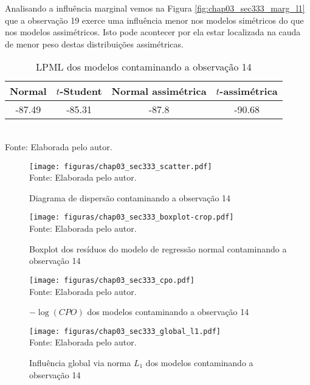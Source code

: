 Analisando a influência marginal vemos na Figura \ref{fig:chap03_sec333_marg_l1} que a observação 19 exerce uma influência menor nos modelos simétricos do que nos modelos assimétricos. Isto pode acontecer por ela estar localizada na cauda de menor peso destas distribuições assimétricas.

\begin{table}[H]
\begin{center}
\caption{LPML dos modelos contaminando a observação 14}
\label{tab:chap03_sec333_lpml}
\begin{tabular}{cccc}
 Normal & $t$-Student & Normal assimétrica  & $t$-assimétrica \\ \hline
-87.49 & -85.31 & -87.8 & -90.68 \\ \hline
\end{tabular}
\\
Fonte: Elaborada pelo autor.
\end{center}
\end{table}


\begin{figure}[H]
\begin{center}
\caption{Diagrama de dispersão contaminando a observação 14}
\label{fig:chap03_sec333_scatter}
\texttt{[image: figuras/chap03\_sec333\_scatter.pdf]}
\\ Fonte: Elaborada pelo autor.
\end{center}
\end{figure}

\begin{figure}[H]
\begin{center}
\caption{Boxplot dos resíduos do modelo de regressão normal contaminando a observação 14}
\label{fig:chap03_sec333_boxplot}
\texttt{[image: figuras/chap03\_sec333\_boxplot-crop.pdf]}
\\ Fonte: Elaborada pelo autor.
\end{center}
\end{figure}

\begin{figure}[H]
\begin{center}
\caption{$-\log(CPO)$ dos modelos contaminando a observação 14}
\label{fig:chap03_sec333_cpo}
\texttt{[image: figuras/chap03\_sec333\_cpo.pdf]}
\\ Fonte: Elaborada pelo autor.
\end{center}
\end{figure}

\begin{figure}[H]
\begin{center}
\caption{Influência global via norma $L_1$ dos modelos contaminando a observação 14}
\label{fig:chap03_sec333_global_l1}
\texttt{[image: figuras/chap03\_sec333\_global\_l1.pdf]}
\\ Fonte: Elaborada pelo autor.
\end{center}
\end{figure}

